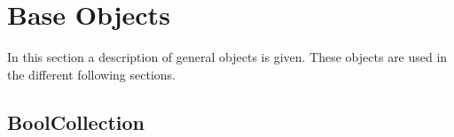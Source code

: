 \newpage
{}
\section{Base Objects}

In this section a description of general objects is given. These objects are used in the different following sections.


\subsection{BoolCollection}

